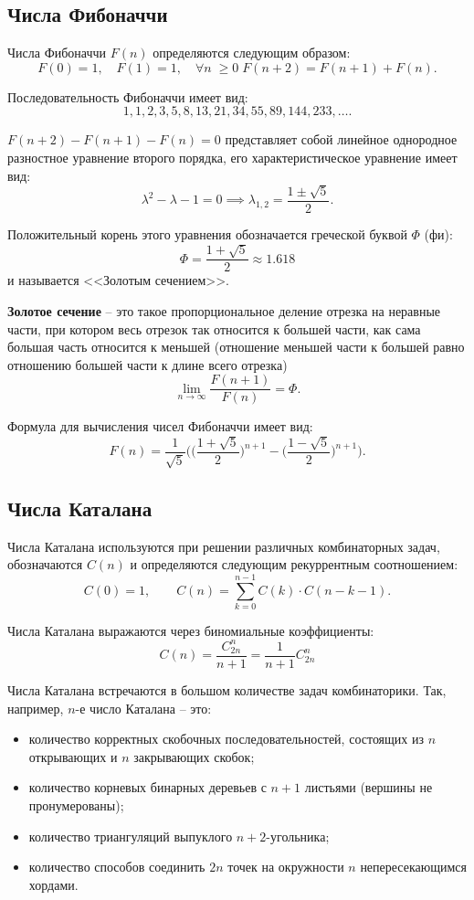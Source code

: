 \documentclass[a5paper, 11pt]{extarticle}
\theoremstyle{definition}
\theoremstyle{definition}
\theoremstyle{definition}
\numberwithin{figure}{section}
\numberwithin{table}{section}
\begin{document}
\subsection{Числа Фибоначчи}

Числа Фибоначчи \(F(n)\) определяются следующим образом:
\[
    F(0) = 1,
    \quad
    F(1) = 1,
    \quad
    \forall n \; \geq 0 \; F(n + 2) = F(n + 1) + F(n).
\]

Последовательность Фибоначчи имеет вид:
\[
    1, 1, 2, 3, 5, 8, 13, 21, 34, 55, 89, 144, 233, \ldots.
\]

\(F(n + 2) - F(n + 1) - F(n) = 0\) представляет собой линейное однородное разностное уравнение второго порядка, его характеристическое уравнение имеет вид:
\[
    \lambda^2 - \lambda - 1 = 0
    \implies
    \lambda_{1, 2} = \frac{1 \pm \sqrt{5}}{2}.
\]

Положительный корень этого уравнения обозначается греческой буквой \(\Phi\) (фи):
\[
    \Phi = \frac{1 + \sqrt{5}}{2} \approx 1.618
\]
и называется <<Золотым сечением>>.

\textbf{Золотое сечение} -- это такое пропорциональное деление отрезка на неравные части, при котором весь отрезок так относится к большей части, как сама большая часть относится к меньшей (отношение меньшей части к большей равно отношению большей части к длине всего отрезка)
\[
    \lim_{n \to \infty} \frac{F(n + 1)}{F(n)} = \Phi.
\]

Формула для вычисления чисел Фибоначчи имеет вид:
\[
    F(n) = \frac{1}{\sqrt{5}} \Bigg( \bigg(\frac{1 + \sqrt{5}}{2} \bigg)^{n + 1} - \bigg( \frac{1 - \sqrt{5}}{2} \bigg)^{n + 1} \Bigg).
\]

\subsection{Числа Каталана}

Числа Каталана используются при решении различных комбинаторных задач, обозначаются \(C(n)\) и определяются следующим рекуррентным соотношением:
\[
    C(0) = 1,
    \qquad
    C(n) = \sum_{k = 0}^{n - 1} C(k) \cdot C(n - k - 1).
\]

Числа Каталана выражаются через биномиальные коэффициенты:
\[
    C(n) = \frac{C_{2n}^n}{n + 1} = \frac{1}{n + 1} C_{2n}^n
\]

Числа Каталана встречаются в большом количестве задач комбинаторики. Так, например, \(n\)-е число Каталана -- это:
\begin{itemize}
    \item количество корректных скобочных последовательностей, состоящих из \(n\) открывающих и \(n\) закрывающих скобок;
    \item количество корневых бинарных деревьев с \(n + 1\) листьями (вершины не пронумерованы);
    \item количество триангуляций выпуклого \(n + 2\)-угольника;
    \item количество способов соединить \(2n\) точек на окружности \(n\) непересекающимся хордами.
\end{itemize}
\end{document}
